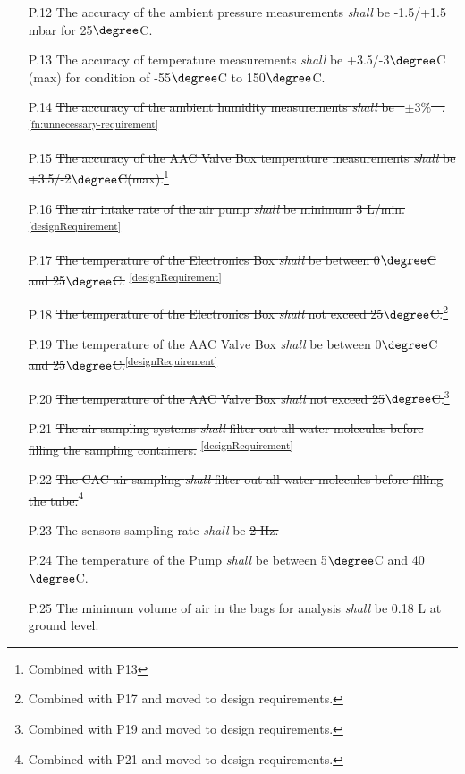 \documentclass[a4paper,12pt,twoside]{article}
\providecommand{\DIFaddtex}[1]{{\protect\color{blue}\uwave{#1}}} %
\providecommand{\DIFdeltex}[1]{{\protect\color{red}\sout{#1}}}                      %
\providecommand{\DIFaddbegin}{} %
\providecommand{\DIFaddend}{} %
\providecommand{\DIFdelbegin}{} %
\providecommand{\DIFdelend}{} %
\providecommand{\DIFadd}[1]{\texorpdfstring{\DIFaddtex{#1}}{#1}} %
\providecommand{\DIFdel}[1]{\texorpdfstring{\DIFdeltex{#1}}{}} %
\newcommand{\DIFscaledelfig}{0.5}
\newlength{\DIFdelgraphicswidth} %
\newlength{\DIFdelgraphicsheight} %
\newcommand{\DIFaddincludegraphics}[2][]{{\color{blue}\fbox{\DIFOincludegraphics[#1]{#2}}}} %
\newcommand{\DIFdelincludegraphics}[2][]{%
\sbox{\DIFdelgraphicsbox}{\DIFOincludegraphics[#1]{#2}}%
\settoboxwidth{\DIFdelgraphicswidth}{\DIFdelgraphicsbox} %
\settoboxtotalheight{\DIFdelgraphicsheight}{\DIFdelgraphicsbox} %
\scalebox{\DIFscaledelfig}{%
\parbox[b]{\DIFdelgraphicswidth}{\usebox{\DIFdelgraphicsbox}\\[-\baselineskip] \rule{\DIFdelgraphicswidth}{0em}}\llap{\resizebox{\DIFdelgraphicswidth}{\DIFdelgraphicsheight}{%
\setlength{\unitlength}{\DIFdelgraphicswidth}%
\begin{picture}(1,1)%
\thicklines\linethickness{2pt} %
{\color[rgb]{1,0,0}\put(0,0){\framebox(1,1){}}}%
{\color[rgb]{1,0,0}\put(0,0){\line( 1,1){1}}}%
{\color[rgb]{1,0,0}\put(0,1){\line(1,-1){1}}}%
\end{picture}%
}\hspace*{3pt}}} %
} %
\DeclareRobustCommand{\DIFaddbegin}{\DIFOaddbegin \let\includegraphics\DIFaddincludegraphics} %
\DeclareRobustCommand{\DIFaddend}{\DIFOaddend \let\includegraphics\DIFOincludegraphics} %
\DeclareRobustCommand{\DIFdelbegin}{\DIFOdelbegin \let\includegraphics\DIFdelincludegraphics} %
\DeclareRobustCommand{\DIFdelend}{\DIFOaddend \let\includegraphics\DIFOincludegraphics} %
\begin{document}
\begin{appendices}
\begin{enumerate}
    \item[P.12] The accuracy of the ambient pressure measurements \textit{shall} be -1.5/+1.5 mbar for 25$\degree$C.
    \item[P.13] The accuracy of temperature measurements \textit{shall} be +3.5/-3$\degree$C (max) for condition of -55$\degree$C to 150$\degree$C.
    \item[P.14] \DIFdelbegin %
\DIFdelend \DIFaddbegin \st{The accuracy of the ambient humidity measurements \textit{shall} be \mbox{%
$\pm 3\%$
}%
.} \DIFaddend \cite{Humiditysensor}\textsuperscript{\ref{fn:unnecessary-requirement}}
    \item[P.15] \st{The accuracy of the AAC Valve Box temperature measurements \textit{shall} be +3.5/-2$\degree$C(max).}\footnote{Combined with P13\label{fn:combi-p13}}
    \item[P.16] \st{The air intake rate of the air pump \textit{shall} be minimum 3 L/min.}\textsuperscript{\ref{designRequirement}}
    \item[P.17] \st{The temperature of the Electronics Box \textit{shall} be between 0$\degree$C and 25$\degree$C.} \textsuperscript{\ref{designRequirement}}
    \item[P.18] \st{The temperature of the Electronics Box \textit{shall} not exceed 25$\degree$C.}\footnote{Combined with P17 and moved to design requirements.\label{fn:combi-p17}}
    \item[P.19] \st{The temperature of the AAC Valve Box \textit{shall} be between 0$\degree$C and 25$\degree$C.}\textsuperscript{\ref{designRequirement}}
    \item[P.20] \st{The temperature of the AAC Valve Box \textit{shall} not exceed 25$\degree$C.}\footnote{Combined with P19 and moved to design requirements.\label{fn:combi-p19}}
    \item[P.21] \st{The air sampling systems \textit{shall} filter out all water molecules before filling the sampling containers.} \textsuperscript{\ref{designRequirement}}
    \item[P.22] \st{The CAC air sampling \textit{shall} filter out all water molecules before filling the tube.}\footnote{Combined with P21 and moved to design requirements.\label{fn:combi-p21}}
    \item[P.23] The sensors sampling rate \textit{shall} be \DIFdelbegin \DIFdel{2 Hz.
    }%
\DIFdelend \DIFaddbegin \DIFadd{1 Hz.
    }\DIFaddend \item[P.24] The temperature of the Pump \textit{shall} be between 5$\degree$C and 40$\degree$C. 
    \item[P.25] The minimum volume of air in the bags for analysis \textit{shall} be 0.18 L at ground level.
 \end{enumerate} 


\end{appendices}
\end{document}
